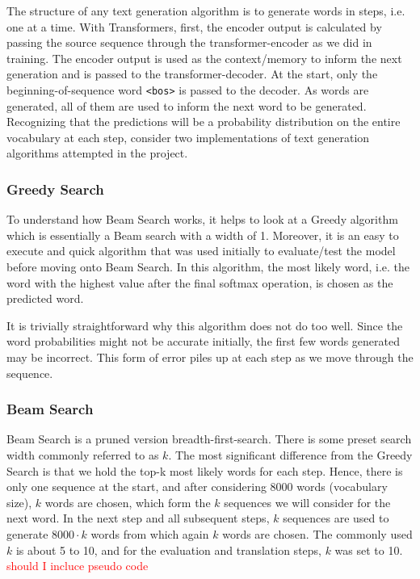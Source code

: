 \documentclass[12pt,a4paper,twoside,openright]{report}
\newcommand{\red}[1]{\textcolor{red}{#1}}
\begin{document}
The structure of any text generation algorithm is to generate words in steps, i.e. one at a time. With Transformers, first, the encoder output is calculated by passing the source sequence through the transformer-encoder as we did in training. The encoder output is used as the context/memory to inform the next generation and is passed to the transformer-decoder. At the start, only the beginning-of-sequence word \lstinline{<bos>} is passed to the decoder. As words are generated, all of them are used to inform the next word to be generated. Recognizing that the predictions will be a probability distribution on the entire vocabulary at each step, consider two implementations of text generation algorithms attempted in the project.

\subsubsection{Greedy Search}
To understand how Beam Search works, it helps to look at a Greedy algorithm which is essentially a Beam search with a width of 1. Moreover, it is an easy to execute and quick algorithm that was used initially to evaluate/test the model before moving onto Beam Search. In this algorithm, the most likely word, i.e. the word with the highest value after the final softmax operation, is chosen as the predicted word.

It is trivially straightforward why this algorithm does not do too well. Since the word probabilities might not be accurate initially, the first few words generated may be incorrect. This form of error piles up at each step as we move through the sequence.

\subsubsection{Beam Search}
Beam Search is a pruned version breadth-first-search. There is some preset search width commonly referred to as $k$. The most significant difference from the Greedy Search is that we hold the top-k most likely words for each step. Hence, there is only one sequence at the start, and after considering 8000 words (vocabulary size), $k$ words are chosen, which form the $k$ sequences we will consider for the next word. In the next step and all subsequent steps, $k$ sequences are used to generate $8000 \cdot k$ words from which again $k$ words are chosen. The commonly used $k$ is about 5 to 10, and for the evaluation and translation steps, $k$ was set to 10. \red{should I incluce pseudo code}
\end{document}
